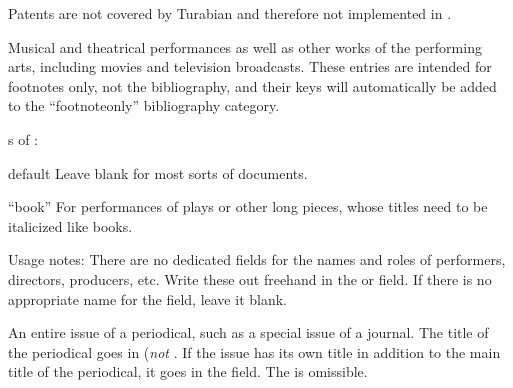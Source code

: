 \documentclass{ltxdockit}[2010/02/12]
\begin{document}
\begin{typelist}
Patents are not covered by Turabian and therefore not implemented in . 





 Musical and theatrical performances as well as other works of the performing arts, including movies and television broadcasts. These entries are intended for footnotes only, not the bibliography, and their keys will automatically be added to the ``footnoteonly'' bibliography category.

s of :
\begin{valuelist}
\item[default] Leave  blank for most sorts of documents.
\item[``book''] For performances of plays or other long pieces, whose titles need to be italicized like books.
\end{valuelist}


Usage notes: There are no dedicated fields for the names and roles of performers, directors, producers, etc.  
Write these out freehand in the  or  field.
If there is no appropriate name for the  field, leave it 
blank.



An entire issue of a periodical, such as a special issue of a journal. The title of the periodical goes in  (\emph{not} . If the issue has its own title in addition to the main title of the periodical, it goes in the  field. The  is omissible.




\end{typelist}
\end{document}
